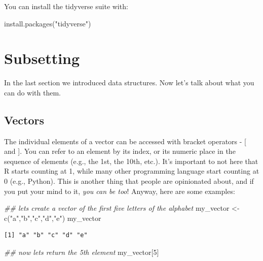 \documentclass[
  letterpaper,
  DIV=11,
  numbers=noendperiod]{scrreprt}
\newenvironment{Shaded}{\begin{snugshade}}{\end{snugshade}}
\newcommand{\DecValTok}[1]{\textcolor[rgb]{0.68,0.00,0.00}{#1}}
\newcommand{\DocumentationTok}[1]{\textcolor[rgb]{0.37,0.37,0.37}{\textit{#1}}}
\newcommand{\FunctionTok}[1]{\textcolor[rgb]{0.28,0.35,0.67}{#1}}
\newcommand{\NormalTok}[1]{\textcolor[rgb]{0.00,0.23,0.31}{#1}}
\newcommand{\OtherTok}[1]{\textcolor[rgb]{0.00,0.23,0.31}{#1}}
\newcommand{\StringTok}[1]{\textcolor[rgb]{0.13,0.47,0.30}{#1}}
\begin{document}
You can install the tidyverse suite with:

\begin{Shaded}
\begin{Highlighting}[]
\FunctionTok{install.packages}\NormalTok{(}\StringTok{"tidyverse"}\NormalTok{)}
\end{Highlighting}
\end{Shaded}

\hypertarget{subsetting}{%
\section{Subsetting}\label{subsetting}}

In the last section we introduced data structures. Now let's talk about
what you can do with them.

\hypertarget{vectors}{%
\subsection{Vectors}\label{vectors}}

The individual elements of a vector can be accessed with bracket
operators - {[} and {]}. You can refer to an element by its index, or
its numeric place in the sequence of elements (e.g., the 1st, the 10th,
etc.). It's important to not here that R starts counting at 1, while
many other programming language start counting at 0 (e.g., Python). This
is another thing that people are opinionated about, and if you put your
mind to it, \emph{you can be too}! Anyway, here are some examples:

\begin{Shaded}
\begin{Highlighting}[]
\DocumentationTok{\#\# let\textquotesingle{}s create a vector of the first five letters of the alphabet}
\NormalTok{my\_vector }\OtherTok{\textless{}{-}} \FunctionTok{c}\NormalTok{(}\StringTok{"a"}\NormalTok{,}\StringTok{"b"}\NormalTok{,}\StringTok{"c"}\NormalTok{,}\StringTok{"d"}\NormalTok{,}\StringTok{"e"}\NormalTok{)}
\NormalTok{my\_vector}
\end{Highlighting}
\end{Shaded}

\begin{verbatim}
[1] "a" "b" "c" "d" "e"
\end{verbatim}

\begin{Shaded}
\begin{Highlighting}[]
\DocumentationTok{\#\# now let\textquotesingle{}s return the 5th element}
\NormalTok{my\_vector[}\DecValTok{5}\NormalTok{]}
\end{Highlighting}
\end{Shaded}
\end{document}
